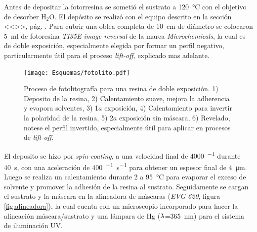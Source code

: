 		Antes de depositar la fotorresina se sometió el sustrato a \SI{120}{\celsius} con el objetivo de desorber H$_2$O. El depósito se realizó con el equipo descrito en la sección <<>>, pág. \pageref{sec:deposito_pdm}. Para cubrir una oblea completa de \SI{10}{\cm} de diámetro se colocaron \SI{5}{\ml} de fotoresina \textit{TI35E image reversal} de la marca \textit{Microchemicals}, la cual es de doble exposición, especialmente elegida por formar un perfil negativo, particularmente útil para el proceso \textit{lift-off}, explicado mas adelante.\cite{MicrochemicalsTeam2009} 
			  \begin{figure}[ht]
			  \begin{center}
			  \texttt{[image: Esquemas/fotolito.pdf]}
			  \caption[Esquema fotolitografía]{Proceso de fotolitografía para una resina de doble exposición. 1) Deposito de la resina, 2) Calentamiento suave, mejora la adherencia y evapora solventes, 3) 1$a$ exposición, 4) Calentamiento para invertir la polaridad de la resina, 5) 2$a$ exposición sin máscara, 6) Revelado, notese el perfil invertido, especialmente útil para aplicar en procesos de\textit{ lift-off}.}
			  \label{esq:fotolito}
			  \end{center}
			  \end{figure}			  
		El deposito se hizo por \textit{spin-coating}, a una velocidad final de \SI{4000}{\min^{-1}} durante \SI{40}{\second}, con una aceleración de \SI{400}{\min^{-1}.\second^{-1}} para obtener un espesor final de \SI{4}{\um}. Luego se realiza un calentamiento durante \SI{2}{\min} a \SI{95}{\celsius} para evaporar el exceso de solvente y promover la adhesión de la resina al sustrato. Seguidamente se cargan el sustrato y la máscara en la alineadora de máscaras (\textit{EVG 620}, figura \ref{fig:alineadora}), la cual cuenta con un microscopio incorporado para hacer la alineación máscara/sustrato y una lámpara de Hg ($\lambda\index{longitud de onda}$=\SI{365}{\nm}) para el sistema de iluminación UV. 

